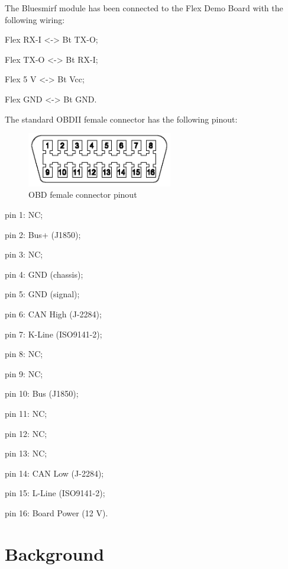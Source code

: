 \documentclass[twoside]{article}
\begin{document}
\begin{multicols}{2}
The Bluesmirf module has been connected to the Flex Demo Board with the following wiring:

\begin{compactitem}
\item Flex RX-I <-> Bt TX-O;
\item Flex TX-O <-> Bt RX-I;
\item Flex 5 V <-> Bt Vcc;
\item Flex GND <-> Bt GND.
\end{compactitem}

The standard OBDII female connector has the following pinout:

\begin{figure}[H]
  \centering
  \includegraphics[width=2.5in]{img/J1962_female_pinout}
  \caption{OBD female connector pinout}
\end{figure}

\begin{compactitem}
\item pin 1: NC;
\item pin 2: Bus+ (J1850);
\item pin 3: NC;
\item pin 4: GND (chassis);
\item pin 5: GND (signal);
\item pin 6: CAN High (J-2284);
\item pin 7: K-Line (ISO9141-2);
\item pin 8: NC;
\item pin 9: NC;
\item pin 10: Bus (J1850);
\item pin 11: NC;
\item pin 12: NC;
\item pin 13: NC;
\item pin 14: CAN Low (J-2284);
\item pin 15: L-Line (ISO9141-2);
\item pin 16: Board Power (12 V).
\end{compactitem}



\section{Background}


\end{multicols}
\end{document}
